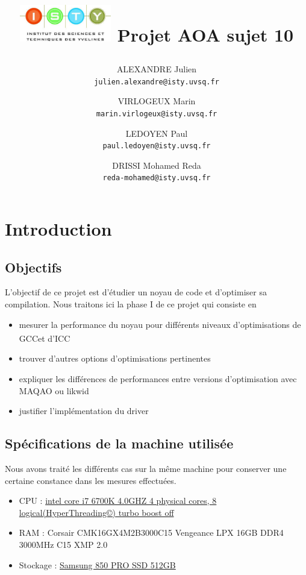 \documentclass{report}
\begin{document}
\title{
  \begin{minipage}\linewidth
      \centering
      \includegraphics[width=40mm]{resources/01.png}\vskip 20pt
      Projet AOA sujet 10
      \vskip 5pt
      \author{
        ALEXANDRE Julien \\
        \texttt{julien.alexandre@isty.uvsq.fr}
      \and
        VIRLOGEUX Marin \\
        \texttt{marin.virlogeux@isty.uvsq.fr}
      \and
        LEDOYEN Paul \\
        \texttt{paul.ledoyen@isty.uvsq.fr}
      \and
        DRISSI Mohamed Reda \\
        \texttt{reda-mohamed@isty.uvsq.fr}
      }
    \end{minipage}
}
\maketitle
\newpage
\tableofcontents
\newpage
\section{Introduction}
 \subsection{Objectifs}
  	L'objectif de ce projet est d'étudier un noyau de code et d'optimiser sa compilation. Nous traitons ici la phase I de ce projet qui consiste en
  	\begin{itemize}
  	\item mesurer la performance du noyau pour différents niveaux d'optimisations de GCC\textsuperscript \textcopyleft   et d'ICC
  	\item trouver d'autres options d'optimisations pertinentes
	\item expliquer les différences de performances entre versions d'optimisation avec MAQAO ou likwid
	\item justifier l'implémentation du driver
  	\end{itemize}
  \subsection{Spécifications de la machine utilisée}
  Nous avons traité les différents cas sur la même machine pour conserver une certaine constance dans les mesures effectuées.
    \begin{itemize}
      \item CPU : \href{https://ark.intel.com/products/88195/Intel-Core-i7-6700K-Processor-8M-Cache-up-to-4_20-GHz}
        {intel core i7 6700K 4.0GHZ 4 physical cores, 8 logical(HyperThreading©) turbo boost off}
      \item RAM : Corsair CMK16GX4M2B3000C15 Vengeance LPX 16GB DDR4 3000MHz C15 XMP 2.0
      \item Stockage : \href{http://downloadcenter.samsung.com/content/UM/201711/20171115103115156/Samsung_SSD_850_PRO_Data_Sheet_Rev_3.pdf}
          {Samsung 850 PRO SSD 512GB}
    \end{itemize}
\end{document}
